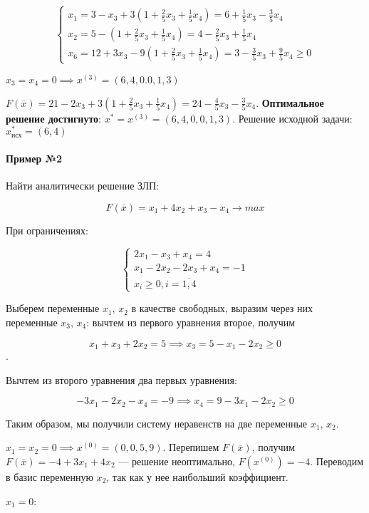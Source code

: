 \documentclass{article}
\begin{document}
$$
\begin{cases}
  x_1 = 3 - x_3 + 3 (1 + \frac{2}{5} x_3 + \frac{1}{5} x_4) = 6 + \frac{1}{5} x_3 - \frac{3}{5} x_4 \\
  x_2 = 5 - (1 + \frac{2}{5} x_3 + \frac{1}{5} x_4) = 4 - \frac{2}{5}x_3 + \frac{1}{5} x_4 \\
  x_6 = 12 + 3x_3 - 9 (1 + \frac{2}{5} x_3 + \frac{1}{5} x_4) = 3 - \frac{3}{5} x_3 + \frac{9}{5} x_4 \ge 0
\end{cases}
$$

$x_3 = x_4 = 0 \implies x^{(3)} = (6, 4, 0. 0, 1, 3)$

$F(\overline{x}) = 21 - 2x_3 + 3 (1 + \frac{2}{5} x_3 + \frac{1}{5} x_4) = 24 - \frac{4}{5} x_3 - \frac{3}{5} x_4$. \textbf{Оптимальное решение достигнуто}: $x^{*} = x^{(3)} = (6, 4, 0, 0, 1, 3)$. Решение исходной задачи: $x^{*}_{\text{исх}} = (6, 4)$

\paragraph{Пример №2}

Найти аналитически решение ЗЛП:

$$
F(\overline{x}) = x_1 + 4x_2 + x_3 - x_4 \to max
$$

При ограничениях:

$$
\begin{cases}
    2x_1 - x_3 + x_4 = 4 \\
    x_1 - 2x_2 - 2x_3 + x_4 = -1 \\
    x_i \ge 0, i = \overline{1, 4}
\end{cases}
$$

Выберем переменные $x_1$, $x_2$ в качестве свободных, выразим через них переменные $x_3$, $x_4$: вычтем из первого уравнения второе, получим  

$$x_1 + x_3 + 2x_2 = 5 \implies x_3 = 5 - x_1 - 2x_2 \ge 0$$.

Вычтем из второго уравнения два первых уравнения:

$$-3x_1 - 2x_2 - x_4 = -9 \implies x_4 = 9 - 3x_1 - 2x_2 \ge 0$$

Таким образом, мы получили систему неравенств на две переменные $x_1$, $x_2$.

$x_1 = x_2 = 0 \implies x^{(0)} = (0,0,5,9)$. Перепишем $F(\overline{x})$, получим $F(\overline{x}) = -4 + 3x_1 + 4x_2$ — решение неоптимально, $F(x^{(0)}) = -4$. Переводим в базис переменную $x_2$, так как у нее наибольший коэффициент.

$x_1 = 0$:
\end{document}
